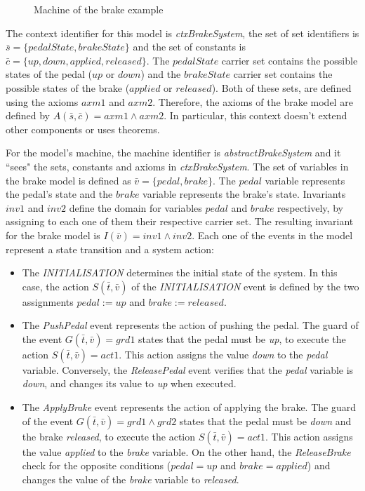 \begin{example}
\begin{figure}[H]
    \caption{Machine of the brake example}
    \label{fig:brake2}
\end{figure}
The context identifier for this model is \textit{ctxBrakeSystem}, the set of set identifiers is $\bar{s} = \{pedalState, brakeState\}$ and the set of constants is $\bar{c} = \{up, down, applied, released \}$. The $pedalState$ carrier set contains the possible states of the pedal ($up$ or $down$) and the $brakeState$ carrier set contains the possible states of the brake ($applied$ or $released$). Both of these sets, are defined using the axioms $axm1$ and $axm2$. Therefore, the axioms of the brake model are defined by $A(\bar{s},\bar{c}) = axm1 \land axm2$. In particular, this context doesn't extend other components or uses theorems. 

For the model's machine, the machine identifier is \textit{abstractBrakeSystem} and it ``sees" the sets, constants and axioms in \textit{ctxBrakeSystem}. The set of variables in the brake model is defined as $\bar{v} = \{pedal, brake\}$. The $pedal$ variable represents the pedal's state and the $brake$ variable represents the brake's state. Invariants $inv1$ and $inv2$ define the domain for variables $pedal$ and $brake$ respectively, by assigning to each one of them their respective carrier set. The resulting invariant for the brake model is $I(\bar{v}) = inv1 \land inv2$. Each one of the events in the model represent a state transition and a system action:
\begin{itemize}
    \item The \textit{INITIALISATION} determines the initial state of the system. In this case, the action $S(\bar{t}, \bar{v})$ of the \textit{INITIALISATION} event is defined by the two assignments $pedal := up$ and $brake := released$.
     
    \item The \textit{PushPedal} event represents the action of pushing the pedal. The guard of the event $G(\bar{t}, \bar{v}) = grd1$ states that the pedal must be \textit{up}, to execute the action $S(\bar{t}, \bar{v}) = act1$. This action assigns the value \textit{down} to the \textit{pedal} variable. Conversely, the \textit{ReleasePedal} event verifies that the \textit{pedal} variable is \textit{down}, and changes its value to \textit{up} when executed.
    
    \item The \textit{ApplyBrake} event represents the action of applying the brake. The guard of the event $G(\bar{t}, \bar{v}) = grd1 \land grd2$ states that the pedal must be \textit{down} and the brake \textit{released}, to execute the action $S(\bar{t}, \bar{v}) = act1$. This action assigns the value \textit{applied} to the \textit{brake} variable. On the other hand, the \textit{ReleaseBrake} check for the opposite conditions ($pedal = up$ and $brake = applied$) and changes the value of the \textit{brake} variable to \textit{released}. 
\end{itemize}
\end{example}


